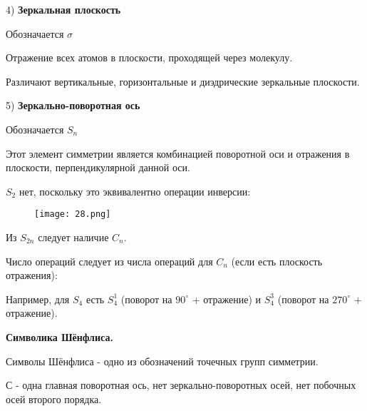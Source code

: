 4) \textbf{Зеркальная плоскость}

\par\smallskip

Обозначается $\sigma$

\par\smallskip

Отражение всех атомов в плоскости, проходящей через
молекулу.

\par\smallskip
Различают вертикальные, горизонтальные и диэдрические
зеркальные плоскости.

\par\smallskip

5) \textbf{Зеркально-поворотная ось}

\par\smallskip 

Обозначается $S_n$

\par\smallskip

Этот элемент симметрии является комбинацией поворотной
оси и отражения в плоскости, перпендикулярной данной оси.

\par\smallskip

$S_2$ нет, поскольку это эквивалентно операции инверсии:

\begin{figure}[H]
	\centering
	{\texttt{[image: 28.png]}}
\end{figure}

Из $S_{2n}$ следует наличие $C_n$.

\par\smallskip

	
Число операций следует из числа операций для $C_n$ (если есть
плоскость отражения):

\par\smallskip

Например, для $S_4$ есть $S_4^1$ (поворот на $90^\circ$ + отражение)	и $S_4^3$ (поворот на $270^\circ$ + отражение).

\begin{center}
\textbf{Символика Шёнфлиса.}
\end{center}	

Символы Шёнфлиса - одно из обозначений точечных групп
симметрии.

\par\smallskip

С - одна главная поворотная ось, нет зеркально-поворотных осей,
нет побочных осей второго порядка.

